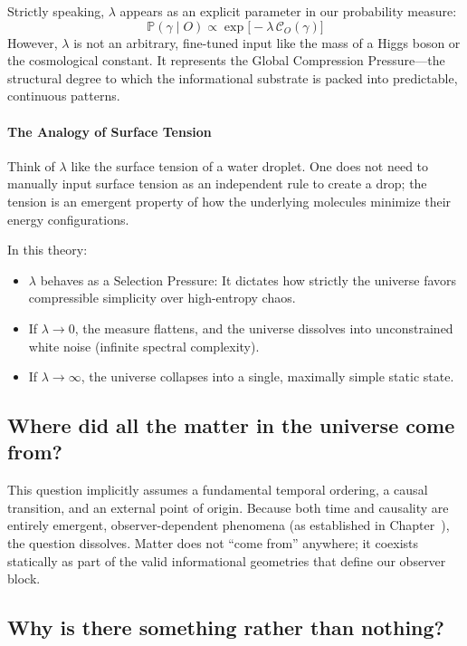 Strictly speaking, $\lambda$ appears as an explicit parameter in our probability measure: 
\[
\mathbb{P}(\gamma \mid O) \propto \exp\bigl[-\lambda\, \mathcal{C}_O(\gamma)\bigr]
\]
However, $\lambda$ is not an arbitrary, fine-tuned input like the mass of a Higgs boson or the cosmological constant.
It represents the Global Compression Pressure—the structural degree to which the informational substrate is packed into predictable, continuous patterns.

\paragraph{The Analogy of Surface Tension}
Think of $\lambda$ like the surface tension of a water droplet.
One does not need to manually input surface tension as an independent rule to create a drop; the tension is an emergent property of how the underlying molecules minimize their energy configurations. 

In this theory:
\begin{itemize}
    \item $\lambda$ behaves as a Selection Pressure: It dictates how strictly the universe favors compressible simplicity over high-entropy chaos.
    \item If $\lambda \to 0$, the measure flattens, and the universe dissolves into unconstrained white noise (infinite spectral complexity).
    \item If $\lambda \to \infty$, the universe collapses into a single, maximally simple static state.
\end{itemize}


\subsection*{Where did all the matter in the universe come from?}

This question implicitly assumes a fundamental temporal ordering, a causal transition, and an external point of origin.
Because both time and causality are entirely emergent, observer-dependent phenomena (as established in Chapter~), the question dissolves.
Matter does not ``come from'' anywhere; it coexists statically as part of the valid informational geometries that define our observer block.


\subsection*{Why is there something rather than nothing?}

